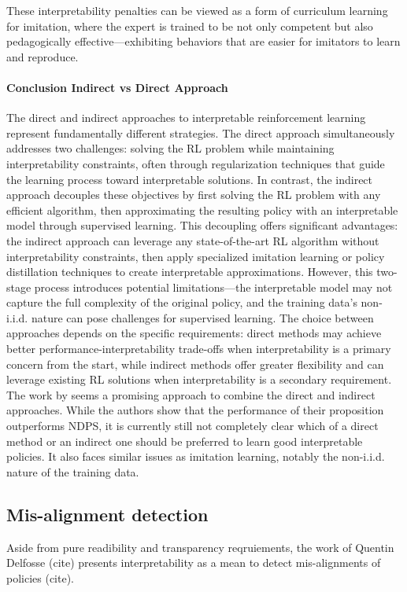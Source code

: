 These interpretability penalties can be viewed as a form of curriculum learning for imitation, where the expert is trained to be not only competent but also pedagogically effective---exhibiting behaviors that are easier for imitators to learn and reproduce.

\paragraph{Conclusion Indirect vs Direct Approach}
The direct and indirect approaches to interpretable reinforcement learning represent fundamentally different strategies. The direct approach simultaneously addresses two challenges: solving the RL problem while maintaining interpretability constraints, often through regularization techniques that guide the learning process toward interpretable solutions. In contrast, the indirect approach decouples these objectives by first solving the RL problem with any efficient algorithm, then approximating the resulting policy with an interpretable model through supervised learning.
This decoupling offers significant advantages: the indirect approach can leverage any state-of-the-art RL algorithm without interpretability constraints, then apply specialized imitation learning or policy distillation techniques to create interpretable approximations. However, this two-stage process introduces potential limitations—the interpretable model may not capture the full complexity of the original policy, and the training data's non-i.i.d. nature can pose challenges for supervised learning.
The choice between approaches depends on the specific requirements: direct methods may achieve better performance-interpretability trade-offs when interpretability is a primary concern from the start, while indirect methods offer greater flexibility and can leverage existing RL solutions when interpretability is a secondary requirement.
The work by \citet{verma_imitation-projected_2019} seems a promising approach to combine the direct and indirect approaches.
While the authors show that the performance of their proposition outperforms NDPS, it is currently still not completely clear which of a direct method or an indirect one should be preferred to learn good interpretable policies.
It also faces similar issues as imitation learning, notably the non-i.i.d. nature of the training data.

\subsection{Mis-alignment detection}
Aside from pure readibility and transparency reqruiements, the work of Quentin Delfosse (cite) presents interpretability as a mean to detect mis-alignments of policies (cite).

